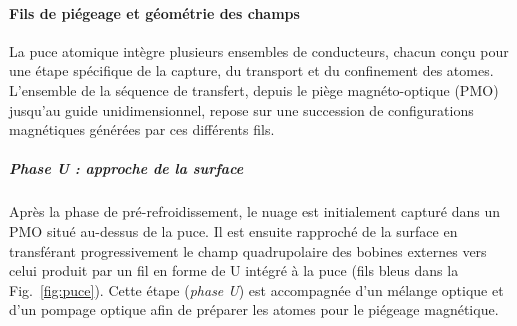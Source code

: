 
\paragraph{Fils de piégeage et géométrie des champs}
La puce atomique intègre plusieurs ensembles de conducteurs, chacun conçu pour une étape spécifique de la capture, du transport et du confinement des atomes. L’ensemble de la séquence de transfert, depuis le piège magnéto-optique (PMO) jusqu’au guide unidimensionnel, repose sur une succession de configurations magnétiques générées par ces différents fils.


\subparagraph{Phase U : approche de la surface}
Après la phase de pré-refroidissement, le nuage est initialement capturé dans un PMO situé au-dessus de la puce. Il est ensuite rapproché de la surface en transférant progressivement le champ quadrupolaire des bobines externes vers celui produit par un fil en forme de U intégré à la puce (fils bleus dans la Fig.~\ref{fig:puce}). Cette étape (\textit{phase U}) est accompagnée d’un mélange optique et d’un pompage optique afin de préparer les atomes pour le piégeage magnétique.


